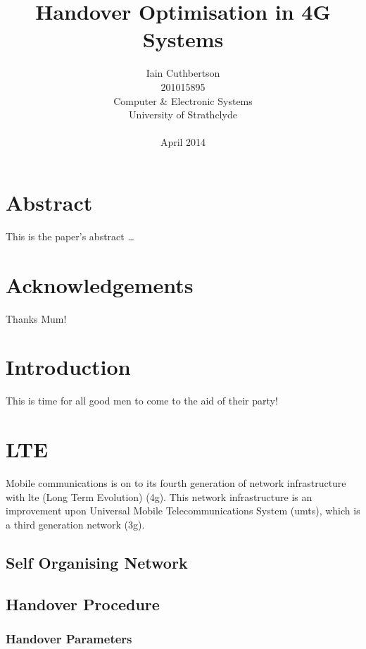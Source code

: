\documentclass[12pt, oneside]{report}
\title{Handover Optimisation in 4G Systems}
\author{
        Iain Cuthbertson \\
        201015895\\
        Computer \& Electronic Systems\\
        University of Strathclyde\\
        \\
        April 2014\\
}
\date{}
\begin{document}
\maketitle


\chapter*{Abstract}
This is the paper's abstract \ldots
{}
\pagebreak

\chapter*{Acknowledgements}
 Thanks Mum!
\pagebreak

\tableofcontents
\pagebreak


\printacronyms[include-classes=nomencl,name=Nomenclature]
\pagebreak

\listoffigures
{}
\pagebreak

\chapter{Introduction}
This is time for all good men to come to the aid of their party!

\chapter{LTE}\label{lte}
Mobile communications is on to its fourth generation of network infrastructure with \ac{lte} (Long Term Evolution) (\ac{4g}). This network infrastructure is an improvement upon Universal Mobile Telecommunications System (\ac{umts}), which is a third generation network (\ac{3g}).
\section{Self Organising Network}\label{self organising network}
\section{Handover Procedure}\label{handover procedure}
\subsection{Handover Parameters}\label{handover parameters}
\end{document}
